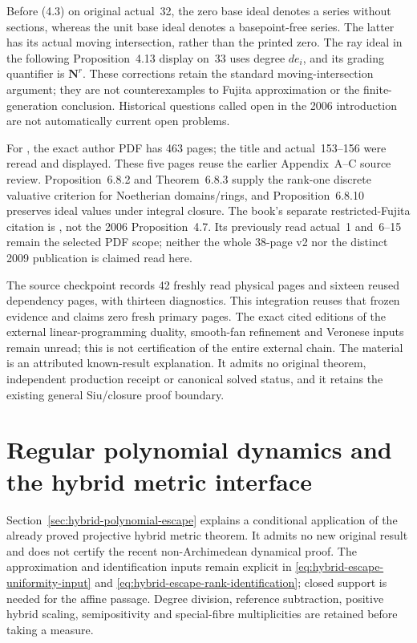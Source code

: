 Before (4.3) on original actual~32, the zero base ideal denotes a
series without sections, whereas the unit base ideal denotes a
basepoint-free series. The latter has its actual moving intersection,
rather than the printed zero. The ray ideal in the following
Proposition~4.13 display on~33 uses degree $de_i$, and its grading
quantifier is $\mathbf N^r$. These corrections retain the standard
moving-intersection argument; they are not counterexamples to Fujita
approximation or the finite-generation conclusion. Historical questions
called open in the 2006 introduction are not automatically current
open problems.

For \cite{SwansonHuneke2006}, the exact author PDF has 463 pages;
the title and actual~153--156 were reread and displayed. These five
pages reuse the earlier Appendix~A--C source review. Proposition~6.8.2
and Theorem~6.8.3 supply the rank-one discrete valuative criterion for
Noetherian domains/rings, and Proposition~6.8.10 preserves ideal values
under integral closure. The book's separate restricted-Fujita citation
is \cite[Definition~2.6, Theorem~2.13]{ELMNP08RestrictedV2}, not the
2006 Proposition~4.7. Its previously read actual~1 and~6--15 remain
the selected PDF scope; neither the whole 38-page v2 nor the distinct
2009 publication is claimed read here.

The source checkpoint records 42 freshly read physical pages and
sixteen reused dependency pages, with thirteen diagnostics. This
integration reuses that frozen evidence and claims zero fresh primary
pages. The exact cited editions of the external linear-programming
duality, smooth-fan refinement and Veronese inputs remain unread;
this is not certification of the entire external chain. The material
is an attributed known-result explanation. It admits no original
theorem, independent production receipt or canonical solved status,
and it retains the existing general Siu/closure proof boundary.

\section{Regular polynomial dynamics and the hybrid metric interface}
\label{sec:provenance-hybrid-polynomial}

Section~\ref{sec:hybrid-polynomial-escape} explains a conditional
application of the already proved projective hybrid metric theorem.
It admits no new original result and does not certify the recent
non-Archimedean dynamical proof. The approximation and identification
inputs remain explicit in
\eqref{eq:hybrid-escape-uniformity-input} and
\eqref{eq:hybrid-escape-rank-identification}; closed support is needed
for the affine passage. Degree division, reference subtraction,
positive hybrid scaling, semipositivity and special-fibre multiplicities
are retained before taking a measure.

